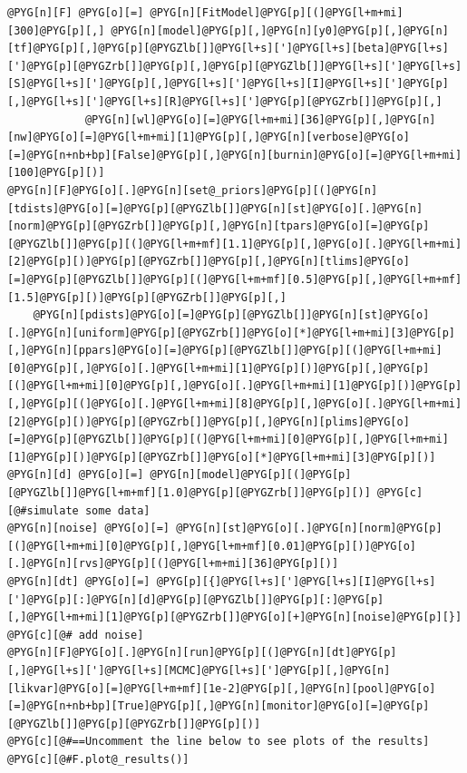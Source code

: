 \documentclass[a4paper,10pt,english]{manual}
\begin{document}
\begin{Verbatim}[commandchars=@\[\]]
@PYG[n][F] @PYG[o][=] @PYG[n][FitModel]@PYG[p][(]@PYG[l+m+mi][300]@PYG[p][,] @PYG[n][model]@PYG[p][,]@PYG[n][y0]@PYG[p][,]@PYG[n][tf]@PYG[p][,]@PYG[p][@PYGZlb[]]@PYG[l+s][']@PYG[l+s][beta]@PYG[l+s][']@PYG[p][@PYGZrb[]]@PYG[p][,]@PYG[p][@PYGZlb[]]@PYG[l+s][']@PYG[l+s][S]@PYG[l+s][']@PYG[p][,]@PYG[l+s][']@PYG[l+s][I]@PYG[l+s][']@PYG[p][,]@PYG[l+s][']@PYG[l+s][R]@PYG[l+s][']@PYG[p][@PYGZrb[]]@PYG[p][,]
            @PYG[n][wl]@PYG[o][=]@PYG[l+m+mi][36]@PYG[p][,]@PYG[n][nw]@PYG[o][=]@PYG[l+m+mi][1]@PYG[p][,]@PYG[n][verbose]@PYG[o][=]@PYG[n+nb+bp][False]@PYG[p][,]@PYG[n][burnin]@PYG[o][=]@PYG[l+m+mi][100]@PYG[p][)]
@PYG[n][F]@PYG[o][.]@PYG[n][set@_priors]@PYG[p][(]@PYG[n][tdists]@PYG[o][=]@PYG[p][@PYGZlb[]]@PYG[n][st]@PYG[o][.]@PYG[n][norm]@PYG[p][@PYGZrb[]]@PYG[p][,]@PYG[n][tpars]@PYG[o][=]@PYG[p][@PYGZlb[]]@PYG[p][(]@PYG[l+m+mf][1.1]@PYG[p][,]@PYG[o][.]@PYG[l+m+mi][2]@PYG[p][)]@PYG[p][@PYGZrb[]]@PYG[p][,]@PYG[n][tlims]@PYG[o][=]@PYG[p][@PYGZlb[]]@PYG[p][(]@PYG[l+m+mf][0.5]@PYG[p][,]@PYG[l+m+mf][1.5]@PYG[p][)]@PYG[p][@PYGZrb[]]@PYG[p][,]
    @PYG[n][pdists]@PYG[o][=]@PYG[p][@PYGZlb[]]@PYG[n][st]@PYG[o][.]@PYG[n][uniform]@PYG[p][@PYGZrb[]]@PYG[o][*]@PYG[l+m+mi][3]@PYG[p][,]@PYG[n][ppars]@PYG[o][=]@PYG[p][@PYGZlb[]]@PYG[p][(]@PYG[l+m+mi][0]@PYG[p][,]@PYG[o][.]@PYG[l+m+mi][1]@PYG[p][)]@PYG[p][,]@PYG[p][(]@PYG[l+m+mi][0]@PYG[p][,]@PYG[o][.]@PYG[l+m+mi][1]@PYG[p][)]@PYG[p][,]@PYG[p][(]@PYG[o][.]@PYG[l+m+mi][8]@PYG[p][,]@PYG[o][.]@PYG[l+m+mi][2]@PYG[p][)]@PYG[p][@PYGZrb[]]@PYG[p][,]@PYG[n][plims]@PYG[o][=]@PYG[p][@PYGZlb[]]@PYG[p][(]@PYG[l+m+mi][0]@PYG[p][,]@PYG[l+m+mi][1]@PYG[p][)]@PYG[p][@PYGZrb[]]@PYG[o][*]@PYG[l+m+mi][3]@PYG[p][)]
@PYG[n][d] @PYG[o][=] @PYG[n][model]@PYG[p][(]@PYG[p][@PYGZlb[]]@PYG[l+m+mf][1.0]@PYG[p][@PYGZrb[]]@PYG[p][)] @PYG[c][@#simulate some data]
@PYG[n][noise] @PYG[o][=] @PYG[n][st]@PYG[o][.]@PYG[n][norm]@PYG[p][(]@PYG[l+m+mi][0]@PYG[p][,]@PYG[l+m+mf][0.01]@PYG[p][)]@PYG[o][.]@PYG[n][rvs]@PYG[p][(]@PYG[l+m+mi][36]@PYG[p][)]
@PYG[n][dt] @PYG[o][=] @PYG[p][{]@PYG[l+s][']@PYG[l+s][I]@PYG[l+s][']@PYG[p][:]@PYG[n][d]@PYG[p][@PYGZlb[]]@PYG[p][:]@PYG[p][,]@PYG[l+m+mi][1]@PYG[p][@PYGZrb[]]@PYG[o][+]@PYG[n][noise]@PYG[p][}] @PYG[c][@# add noise]
@PYG[n][F]@PYG[o][.]@PYG[n][run]@PYG[p][(]@PYG[n][dt]@PYG[p][,]@PYG[l+s][']@PYG[l+s][MCMC]@PYG[l+s][']@PYG[p][,]@PYG[n][likvar]@PYG[o][=]@PYG[l+m+mf][1e-2]@PYG[p][,]@PYG[n][pool]@PYG[o][=]@PYG[n+nb+bp][True]@PYG[p][,]@PYG[n][monitor]@PYG[o][=]@PYG[p][@PYGZlb[]]@PYG[p][@PYGZrb[]]@PYG[p][)]
@PYG[c][@#==Uncomment the line below to see plots of the results]
@PYG[c][@#F.plot@_results()]
\end{Verbatim}
\end{document}
